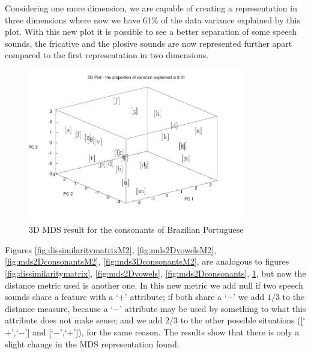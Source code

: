 Considering one more dimension, we are capable of creating a representation in three dimensions where now we have 61\% of the data variance explained by this plot. With this new plot it is possible to see a better separation of some speech sounds, the fricative and the plosive sounds are now represented further apart compared to the first representation in two dimensions. 

\begin{figure}[h!]
\centering
\includegraphics[width=0.85\textwidth]{images/mds_consonantsPT_3D.pdf}
\caption{3D MDS result for the consonants of Brazilian Portuguese}
\label{fig:mds3Dconsonants}
\end{figure}

Figures \ref{fig:dissimilaritymatrixM2}, \ref{fig:mds2DvowelsM2}, \ref{fig:mds2DconsonantsM2}, \ref{fig:mds3DconsonantsM2}, are analogous to figures \ref{fig:dissimilaritymatrix}, \ref{fig:mds2Dvowels}, \ref{fig:mds2Dconsonants}, \ref{fig:mds3Dconsonants}, but now the distance metric used is another one. In this new metric we add null if two speech sounds share a feature with a `$+$' attribute; if both share a `$-$' we add $1/3$ to the distance measure, because a `$-$' attribute may be used by something to what this attribute does not make sense; and we add $2/3$ to the other possible situations ([`$+$',`$-$'] and [`$-$',`$+$']), for the same reason. The results show that there is only a slight change in the MDS representation found.

